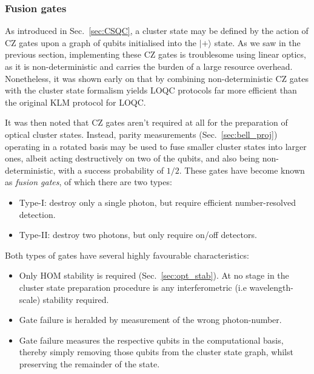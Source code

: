 \documentclass[aps, rmp, twocolumn, amsmath, amssymb, nofootinbib, superscriptaddress, longbibliography, floatfix, table-of-contents, eqsecnum]{revtex4-1}
\newcommand{\ket}[1]{|#1\rangle}
\newcommand{\comment}[1]{{\color{blue}{\textbf{#1}}}}
\begin{document}
%
%

\subsubsection{Fusion gates} 

As introduced in Sec.~\ref{sec:CSQC}, a cluster state may be defined by the action of CZ gates upon a graph of qubits initialised into the $\ket{+}$ state. As we saw in the previous section, implementing these CZ gates is troublesome using linear optics, as it is non-deterministic and carries the burden of a large resource overhead. Nonetheless, it was shown early on \cite{NielsenOptCS} that by combining non-deterministic CZ gates with the cluster state formalism yields LOQC protocols far more efficient than the original KLM protocol for LOQC.

It was then noted \cite{BrowneRudolph} that CZ gates aren't required at all for the preparation of optical cluster states. Instead, parity measurements (Sec.~\ref{sec:bell_proj}) operating in a rotated basis may be used to fuse smaller cluster states into larger ones, albeit acting destructively on two of the qubits, and also being non-deterministic, with a success probability of $1/2$. These gates have become known as \textit{fusion gates}, of which there are two types:
\begin{itemize}
	\item Type-I: destroy only a single photon, but require efficient number-resolved detection.
	\item Type-II: destroy two photons, but only require on/off detectors.
\end{itemize}
Both types of gates have several highly favourable characteristics:
\begin{itemize}
	\item Only HOM stability is required (Sec.~\ref{sec:opt_stab}). At no stage in the cluster state preparation procedure is any interferometric (i.e wavelength-scale) stability required.
	\item Gate failure is heralded by measurement of the wrong photon-number.
	\item Gate failure measures the respective qubits in the computational basis, thereby simply removing those qubits from the cluster state graph, whilst preserving the remainder of the state.
\end{itemize}

\comment{To do!}

%
%
\end{document}
